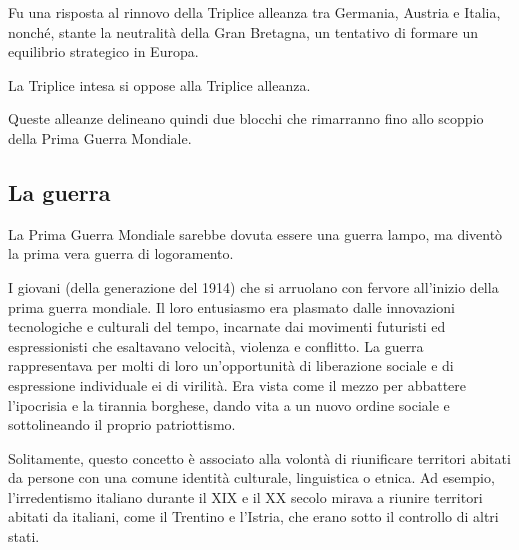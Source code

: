 \documentclass[a4paper]{article}
\begin{document}
Fu una risposta al rinnovo della Triplice alleanza tra Germania,
Austria e Italia, nonché, stante la neutralità della Gran Bretagna,
un tentativo di formare un equilibrio strategico in Europa.



La Triplice intesa si oppose alla Triplice alleanza.

Queste alleanze delineano quindi due blocchi che rimarranno fino allo scoppio della Prima
Guerra Mondiale.

\subsection{La guerra}

La Prima Guerra Mondiale sarebbe dovuta essere una guerra lampo, ma diventò la prima
vera guerra di logoramento.

I giovani (della generazione del 1914) che si arruolano con fervore
all'inizio della prima guerra mondiale.
Il loro entusiasmo era plasmato dalle innovazioni tecnologiche e culturali del tempo,
incarnate dai movimenti futuristi ed espressionisti che esaltavano velocità,
violenza e conflitto.
La guerra rappresentava per molti di loro un'opportunità di liberazione sociale e
di espressione individuale ei di virilità.
Era vista come il mezzo per abbattere l'ipocrisia e la tirannia borghese,
dando vita a un nuovo ordine sociale e sottolineando il proprio patriottismo.



Solitamente, questo concetto è associato alla volontà di riunificare territori
abitati da persone con una comune identità culturale, linguistica o etnica.
Ad esempio, l'irredentismo italiano durante il XIX e il XX secolo mirava a
riunire territori abitati da italiani, come il Trentino e l'Istria, che erano
sotto il controllo di altri stati.
\end{document}
